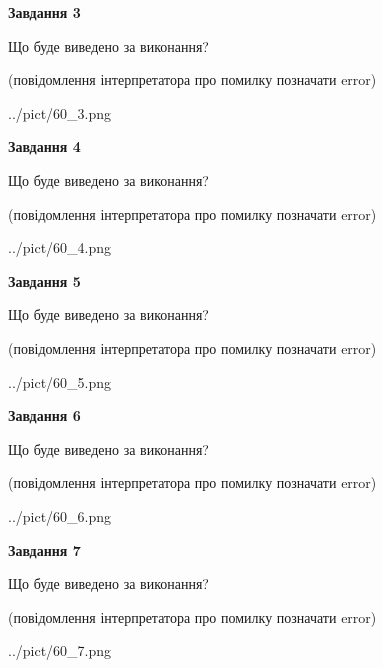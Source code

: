 \documentclass[12pt, ukrainian]{article}
\begin{document}
{\begin {large}
{\begin {center}\textbf{Завдання 3}\end {center}}\par
Що буде виведено за виконання?\par
 (повідомлення інтерпретатора про помилку позначати error)\par
\begin{center}
	{../pict/60_3.png}
\end{center}
\newpage

{\begin {center}\textbf{Завдання 4}\end {center}}\par
Що буде виведено за виконання?\par
 (повідомлення інтерпретатора про помилку позначати error)\par
\begin{center}
	{../pict/60_4.png}
\end{center}
\newpage

{\begin {center}\textbf{Завдання 5}\end {center}}\par
Що буде виведено за виконання?\par
 (повідомлення інтерпретатора про помилку позначати error)\par
\begin{center}
	{../pict/60_5.png}
\end{center}
\newpage

{\begin {center}\textbf{Завдання 6}\end {center}}\par
Що буде виведено за виконання?\par
 (повідомлення інтерпретатора про помилку позначати error)\par
\begin{center}
	{../pict/60_6.png}
\end{center}
\newpage

{\begin {center}\textbf{Завдання 7}\end {center}}\par
Що буде виведено за виконання?\par
 (повідомлення інтерпретатора про помилку позначати error)\par
\begin{center}
	{../pict/60_7.png}
\end{center}
\newpage


\end{large}}
\end{document}
